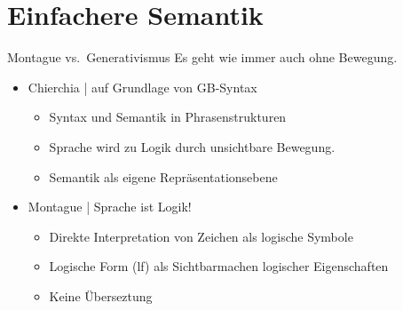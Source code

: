 

\section{Einfachere Semantik}

\begin{frame}
  {Montague vs.\ Generativismus}
  \onslide<+->
  \onslide<+->
  Es geht wie immer auch ohne Bewegung.\\
  \Zeile 
  \begin{itemize}[<+->]
    \item Chierchia | auf Grundlage von GB-Syntax
      \begin{itemize}[<+->]
        \item Syntax und \alert{Semantik in Phrasenstrukturen}
        \item Sprache wird zu Logik durch unsichtbare Bewegung.
        \item Semantik als \alert{eigene Repräsentationsebene}
      \end{itemize}
      \Halbzeile
    \item Montague | \alert{Sprache ist Logik!}
      \begin{itemize}[<+->]
        \item Direkte Interpretation von Zeichen als logische Symbole
        \item Logische Form (lf) als \alert{Sichtbarmachen} logischer Eigenschaften
        \item \alert{Keine Überseztung}
      \end{itemize}
  \end{itemize}
\end{frame}

